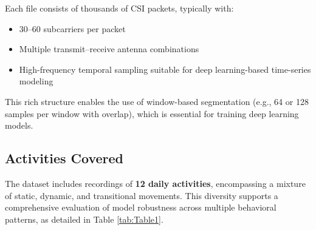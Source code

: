 Each file consists of thousands of CSI packets, typically with:
\begin{itemize}
    \item 30--60 subcarriers per packet
    \item Multiple transmit--receive antenna combinations
    \item High-frequency temporal sampling suitable for deep learning-based time-series modeling
\end{itemize}

This rich structure enables the use of window-based segmentation (e.g., 64 or 128 samples per window with overlap), which is essential for training deep learning models.



\subsection{Activities Covered}
The dataset includes recordings of \textbf{12 daily activities}, encompassing a mixture of static, dynamic, and transitional movements. This diversity supports a comprehensive evaluation of model robustness across multiple behavioral patterns, as detailed in Table \ref{tab:Table1}.


